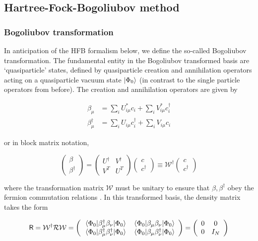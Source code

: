 \subsection{Hartree-Fock-Bogoliubov method}
\subsubsection{Bogoliubov transformation}

In anticipation of the HFB formalism below, we define the so-called Bogoliubov transformation. The fundamental entity in the Bogoliubov transformed basis are `quasiparticle' states, defined by quasiparticle creation and annihilation operators acting on a quasiparticle vacuum state $\ket{\Phi_0}$ (in contrast to the single particle operators from before). The creation and annihilation operators are given by

\begin{align}
\beta_\mu &= \sum_i U^*_{i\mu}c_i + \sum_i V^*_{i\mu}c_i^\dagger \\
\beta_\mu^\dagger &= \sum_i U_{i\mu}c_i^\dagger + \sum_i V_{i\mu}c_i
\end{align}

\noindent or in block matrix notation,

\begin{equation}
\left(\begin{array}{c} \beta \\ \beta^\dagger\end{array}\right) = 
\left(\begin{array}{cc} U^\dagger & V^\dagger \\ V^T & U^T \end{array}\right)
\left(\begin{array}{c} c \\ c^\dagger\end{array}\right)
\equiv \mathcal{W}^\dagger \left(\begin{array}{c} c \\ c^\dagger\end{array}\right)
\end{equation}

\noindent where the transformation matrix $\mathcal{W}$ must be unitary to ensure that $\beta, \beta^\dagger$ obey the fermion commutation relations \cite{Ring1980}. In this transformed basis, the density matrix takes the form 

\begin{equation}
\mathsf{R} = \mathcal{W}^\dagger\mathcal{R}\mathcal{W} = 
\left(\begin{array}{cc}
\expval{\beta_\mu^\dagger \beta_\nu}{\Phi_0} & \expval{\beta_\mu \beta_\nu}{\Phi_0} \\
\expval{\beta_\mu^\dagger \beta_\nu^\dagger}{\Phi_0} & \expval{\beta_\mu \beta_\nu^\dagger}{\Phi_0}
\end{array}\right) = 
\left(\begin{array}{cc}
0 & 0 \\
0 & I_N
\end{array}\right)
\end{equation}

